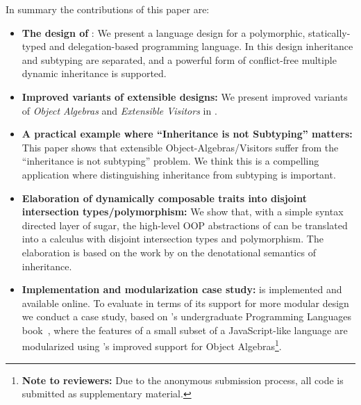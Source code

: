 In summary the contributions of this paper are:

\begin{itemize}

\item {\bf The design of \name}: We present a language design for a polymorphic,
  statically-typed and delegation-based programming language. In this design
  inheritance and subtyping are separated, and a powerful form of conflict-free
  multiple dynamic inheritance is supported.

\item {\bf Improved variants of extensible designs:} We present
  improved variants of \emph{Object
    Algebras} and \emph{Extensible Visitors} in \name. 

\item {\bf A practical example where ``Inheritance is not Subtyping'' matters:}
  This paper shows that extensible Object-Algebras/Visitors suffer from the
  ``inheritance is not subtyping'' problem. We think this is a
  compelling application where distinguishing inheritance from
  subtyping is important. 

\item {\bf Elaboration of dynamically composable traits into disjoint
    intersection types/polymorphism:} We show that, with a simple syntax directed layer of
  sugar, the high-level OOP abstractions of \name can be translated into a
  calculus with disjoint intersection types and polymorphism. The elaboration is
  based on the work by \citet{cook1989denotational} on the denotational semantics of
  inheritance.

\item {\bf Implementation and modularization case study:} \name is implemented
  and available online. To evaluate \name in terms of its support for more
  modular design we conduct a case study, based on \citeauthor{poplcook}'s undergraduate
  Programming Languages book~\cite{poplcook}, where the features of a small
  subset of a JavaScript-like language are modularized using \name's improved
  support for Object Algebras\footnote{{\bf Note to reviewers:} Due to the
    anonymous submission process, all code is submitted as supplementary material.}.

\end{itemize}

